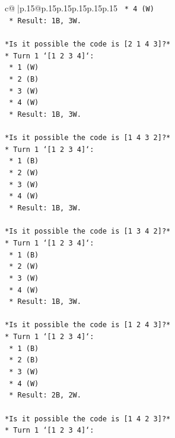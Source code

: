 \documentclass{article}
\begin{document}
{\begin{supertabular}{c@{$\;$}|p{.15\linewidth}@{}p{.15\linewidth}p{.15\linewidth}p{.15\linewidth}p{.15\linewidth}p{.15\linewidth}}
{{{\texttt{    *   4 (W)} \\
\texttt{    *   Result: 1B, 3W.} \\
\\ 
\texttt{*Is it possible the code is {[}2 1 4 3{]}?*} \\
\texttt{*   Turn 1 `{[}1 2 3 4{]}`:} \\
\texttt{    *   1 (W)} \\
\texttt{    *   2 (B)} \\
\texttt{    *   3 (W)} \\
\texttt{    *   4 (W)} \\
\texttt{    *   Result: 1B, 3W.} \\
\\ 
\texttt{*Is it possible the code is {[}1 4 3 2{]}?*} \\
\texttt{*   Turn 1 `{[}1 2 3 4{]}`:} \\
\texttt{    *   1 (B)} \\
\texttt{    *   2 (W)} \\
\texttt{    *   3 (W)} \\
\texttt{    *   4 (W)} \\
\texttt{    *   Result: 1B, 3W.} \\
\\ 
\texttt{*Is it possible the code is {[}1 3 4 2{]}?*} \\
\texttt{*   Turn 1 `{[}1 2 3 4{]}`:} \\
\texttt{    *   1 (B)} \\
\texttt{    *   2 (W)} \\
\texttt{    *   3 (W)} \\
\texttt{    *   4 (W)} \\
\texttt{    *   Result: 1B, 3W.} \\
\\ 
\texttt{*Is it possible the code is {[}1 2 4 3{]}?*} \\
\texttt{*   Turn 1 `{[}1 2 3 4{]}`:} \\
\texttt{    *   1 (B)} \\
\texttt{    *   2 (B)} \\
\texttt{    *   3 (W)} \\
\texttt{    *   4 (W)} \\
\texttt{    *   Result: 2B, 2W.} \\
\\ 
\texttt{*Is it possible the code is {[}1 4 2 3{]}?*} \\
\texttt{*   Turn 1 `{[}1 2 3 4{]}`:} \\
}}}
\end{supertabular}}
\end{document}
